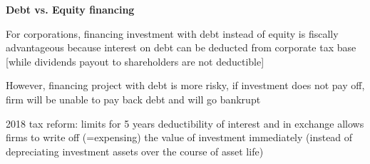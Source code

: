 \documentclass[landscape]{slides}
\begin{document}
\begin{slide}
\begin{center}
{\bf Debt vs. Equity financing}
\end{center}
For corporations, financing investment with debt instead of equity is fiscally advantageous because
interest on debt can be deducted from corporate tax base [while dividends payout to shareholders are not
deductible]

However, financing project with debt is more risky, if investment does not pay off, 
firm will be unable to pay back debt and will go bankrupt

2018 tax reform: limits for 5 years deductibility of interest and in exchange allows firms to write off (=expensing)
the value of investment immediately (instead of depreciating investment assets over the course
of asset life)


\end{slide}


%

%
%
%
%
%
%
%
%
%
\end{document}
